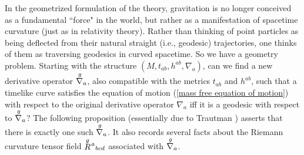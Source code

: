 \documentclass [12] {article}
\theoremstyle{plain}
\numberwithin{figure}{subsection}
\numberwithin{proposition}{subsection}
\begin{document}
In the geometrized formulation of the theory, gravitation is no longer conceived as a fundamental ``force" in the world, but rather as a manifestation of spacetime curvature (just as in relativity theory). Rather than thinking of point particles as being deflected from their natural straight (i.e., geodesic) trajectories, one thinks of them as traversing geodesics in curved spacetime. So we have a geometry problem. Starting with the structure $(M, t_{ab}, h^{ab}, \nabla_a)$, can we find a new derivative operator $\stackrel{g \hspace{.4em}}{\nabla_a}$, also compatible with the metrics $t_{ab}$ and $h^{ab}$, such that a timelike curve satisfies the equation of motion (\ref{mass free equation of motion}) with respect to the original derivative operator $\nabla_a$  iff it is a geodesic with respect to $\stackrel{g \hspace{.4em}}{\nabla_a}$? The following proposition (essentially due to Trautman ) asserts that there is exactly one such $\stackrel{g \hspace{.4em}}{\nabla_a}$. It also records several facts about the Riemann curvature tensor field $\stackrel{g}{R}{}\hspace{-.2em}^a{}_{bcd}$ associated with $\stackrel{g \hspace{.4em}}{\nabla_a}$.  
\end{document}
